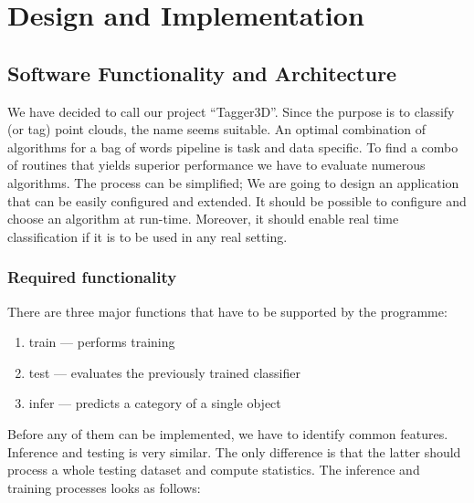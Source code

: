 \chapter{Design and Implementation}

\section{Software Functionality and Architecture}
	
	We have decided to call our project ``Tagger3D''.  Since the purpose is to classify (or tag) point clouds, the name seems suitable. An optimal combination of algorithms for a bag of words pipeline is task and data specific. To find a combo of routines that yields superior performance we have to evaluate numerous algorithms. The process can be simplified; We are going to design an application that can be easily configured and extended. It should be possible to configure and choose an algorithm at run-time. Moreover, it should enable real time classification if it is to be used in any real setting.
	
	\subsection{Required functionality}	
	There are three major functions that have to be supported by the programme:
	\begin{enumerate}
	 \item train --- performs training
	 \item test --- evaluates the previously trained classifier
	 \item infer --- predicts a category of a single object
	\end{enumerate}
	
	Before any of them can be implemented, we have to identify common features. Inference and testing is very similar. The only difference is that the latter should process a whole testing dataset and compute statistics. The inference and training processes looks as follows:
	
